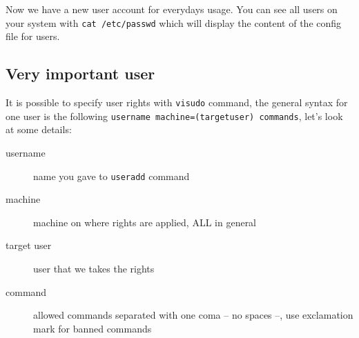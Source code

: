 Now we have a new user account for everydays usage. You can see all users on 
your system with \og{}\texttt{cat /etc/passwd}\fg{} which will display the 
content of the config file for users.

\subsection{Very important user}
It is possible to specify user rights with \texttt{visudo} command, the general syntax for one user is 
the following \og{}\texttt{username machine=(targetuser) commands}\fg{}, 
let's look at some details:



\begin{description}
\item[username] name you gave to \texttt{useradd} command
\item[machine] machine on where rights are applied, ALL in general
\item[target user] user that we takes the rights
\item[command] allowed commands separated with one coma -- no spaces --, 
use exclamation mark for banned commands
\end{description}

%
